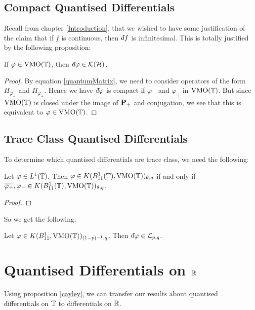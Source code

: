 \subsection{Compact Quantised Differentials}
Recall from chapter \ref{Introduction}, that we wished to have some justification
of the claim that if $f$ is continuous, then $\qd f$ is infinitesimal. This is totally
justified by the following proposition:
\begin{proposition}
    If $\varphi \in \operatorname{VMO}(\mathbb{T})$, then $\qd \varphi \in \mathcal{K}(\Hilb)$.
\end{proposition}
\begin{proof}
    By equation \ref{quantumMatrix}, we need to consider operators of the form $H_{\varphi_-}$
    and $H_{\overline{\varphi_+}}$. Hence we have $\qd \varphi$ is compact
    if $\overline{\varphi_-}$ and $\varphi_+$ in $\operatorname{VMO}(\mathbb{T})$. But 
    since $\operatorname{VMO}(\mathbb{T})$ is closed under the image of $\mathbf{P}_+$ and conjugation,
    we see that this is equivalent to $\varphi \in \operatorname{VMO}(\mathbb{T})$. 
\end{proof}


\subsection{Trace Class Quantised Differentials}


To determine which quantised differentials are trace class, we need
the following:
\begin{lemma}
    Let $\varphi \in L^1(\mathbb{T})$. Then $\varphi \in K(B_{11}^1(\mathbb{T}),\operatorname{VMO}(\mathbb{T}))_{\theta,q}$ if and only
    if $\overline{\varphi_+},\varphi_- \in K(B_{11}^1(\mathbb{T}),\operatorname{VMO}(\mathbb{T}))_{\theta,q}$.
\end{lemma}
\begin{proof}
    
\end{proof}
    
So we get the following:
\begin{corollary}
    Let $\varphi\in K(B_{11}^1,\operatorname{VMO}(\mathbb{T}))_{(1-p)^{-1},q}$. Then $\qd \varphi \in \mathcal{L}_{p,q}$. 
\end{corollary}

\section{Quantised Differentials on $\mathbb{R}$}
Using proposition \ref{cayley}, we can transfer our results
about quantised differentials on $\mathbb{T}$ to differentials on $\mathbb{R}$.

